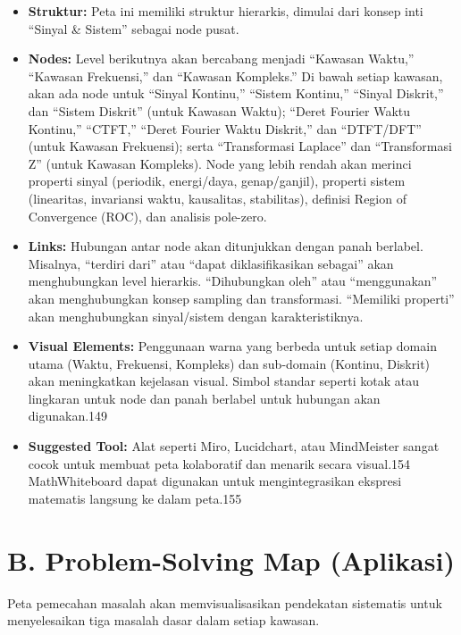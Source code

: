 \documentclass[
  letterpaper,
  DIV=11,
  numbers=noendperiod]{scrreprt}
\begin{document}
\begin{itemize}
\item
  \textbf{Struktur:} Peta ini memiliki struktur hierarkis, dimulai dari
  konsep inti ``Sinyal \& Sistem'' sebagai node pusat.
\item
  \textbf{Nodes:} Level berikutnya akan bercabang menjadi ``Kawasan
  Waktu,'' ``Kawasan Frekuensi,'' dan ``Kawasan Kompleks.'' Di bawah
  setiap kawasan, akan ada node untuk ``Sinyal Kontinu,'' ``Sistem
  Kontinu,'' ``Sinyal Diskrit,'' dan ``Sistem Diskrit'' (untuk Kawasan
  Waktu); ``Deret Fourier Waktu Kontinu,'' ``CTFT,'' ``Deret Fourier
  Waktu Diskrit,'' dan ``DTFT/DFT'' (untuk Kawasan Frekuensi); serta
  ``Transformasi Laplace'' dan ``Transformasi Z'' (untuk Kawasan
  Kompleks). Node yang lebih rendah akan merinci properti sinyal
  (periodik, energi/daya, genap/ganjil), properti sistem (linearitas,
  invariansi waktu, kausalitas, stabilitas), definisi Region of
  Convergence (ROC), dan analisis pole-zero.
\item
  \textbf{Links:} Hubungan antar node akan ditunjukkan dengan panah
  berlabel. Misalnya, ``terdiri dari'' atau ``dapat diklasifikasikan
  sebagai'' akan menghubungkan level hierarkis. ``Dihubungkan oleh''
  atau ``menggunakan'' akan menghubungkan konsep sampling dan
  transformasi. ``Memiliki properti'' akan menghubungkan sinyal/sistem
  dengan karakteristiknya.
\item
  \textbf{Visual Elements:} Penggunaan warna yang berbeda untuk setiap
  domain utama (Waktu, Frekuensi, Kompleks) dan sub-domain (Kontinu,
  Diskrit) akan meningkatkan kejelasan visual. Simbol standar seperti
  kotak atau lingkaran untuk node dan panah berlabel untuk hubungan akan
  digunakan.149
\item
  \textbf{Suggested Tool:} Alat seperti Miro, Lucidchart, atau
  MindMeister sangat cocok untuk membuat peta kolaboratif dan menarik
  secara visual.154 MathWhiteboard dapat digunakan untuk
  mengintegrasikan ekspresi matematis langsung ke dalam peta.155
\end{itemize}

\section{B. Problem-Solving Map
(Aplikasi)}\label{b.-problem-solving-map-aplikasi}

Peta pemecahan masalah akan memvisualisasikan pendekatan sistematis
untuk menyelesaikan tiga masalah dasar dalam setiap kawasan.
\end{document}
